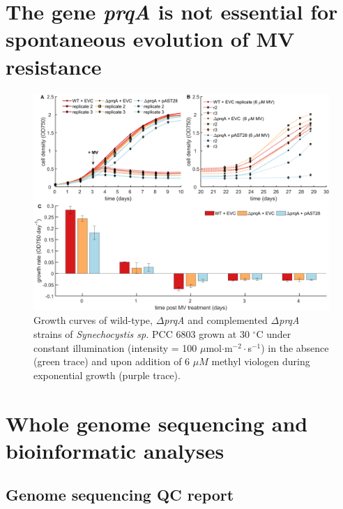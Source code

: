 \documentclass[12pt]{article}
\begin{document}
\section{The gene \textit{prqA} is not essential for spontaneous evolution of MV resistance}


\begin{figure}[H]
    \centering
    \includegraphics[width=\hsize]{../Figures/MV_adaptation/prqA_MvADapt_multipanel.png}
    \caption{Growth curves of wild-type, $\Delta$\textit{prqA} and complemented $\Delta$\textit{prqA} strains of \textit{Synechocystis sp.} PCC 6803 grown at 30 $^\circ$C under constant illumination (intensity = 100 $\mu$mol$\cdot$m$^{-2}\cdot$s$^{-1}$) in the absence (green trace) and upon addition  of 6 $\mu M$  methyl viologen during exponential growth (purple trace).}
    \label{fig:prqAMV}
\end{figure}


\section{Whole genome sequencing and bioinformatic analyses}


\subsection{Genome sequencing QC report}
\end{document}

